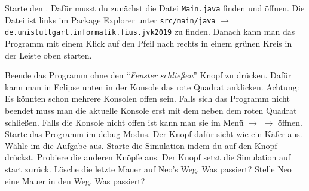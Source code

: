 

Starte den \simulator.
Dafür musst du zunächst die Datei \texttt{Main.java} finden und öffnen.
Die Datei ist links im Package Explorer unter \texttt{src/main/java} $\to$ \texttt{de.unistuttgart.informatik.fius.jvk2019} zu finden.
Danach kann man das Programm mit einem Klick auf den Pfeil nach rechts in einem grünen Kreis in der Leiste oben starten.


    \subexcercise Beende das Programm ohne den "`\textit{Fenster schließen}"' Knopf zu drücken.
        Dafür kann man in Eclipse unten in der Konsole das rote Quadrat anklicken.
        Achtung: Es könnten schon mehrere Konsolen offen sein.
        Falls sich das Programm nicht beendet muss man die aktuelle Konsole erst mit dem  neben dem roten Quadrat schließen.
        Falls die Konsole nicht offen ist kann man sie im Menü  $\to$  $\to$  öffnen.
    \subexcercise Starte das Programm im debug Modus.
        Der Knopf dafür sieht wie ein Käfer aus.
    \subexcercise Wähle im \simulator{} die Aufgabe  aus.
        Starte die Simulation indem du auf den  Knopf drückst.
        Probiere die anderen Knöpfe aus.
        Der  Knopf setzt die Simulation auf start zurück.
    \subexcercise Lösche die letzte Mauer auf Neo's Weg.
        Was passiert?
    \subexcercise Stelle Neo eine Mauer in den Weg.
        Was passiert?

